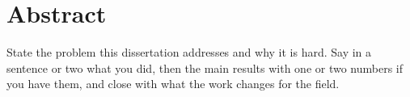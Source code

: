 \chapter*{Abstract}
State the problem this dissertation addresses and why it is hard. Say in a sentence or two
what you did, then the main results with one or two numbers if you have them, and close
with what the work changes for the field.
